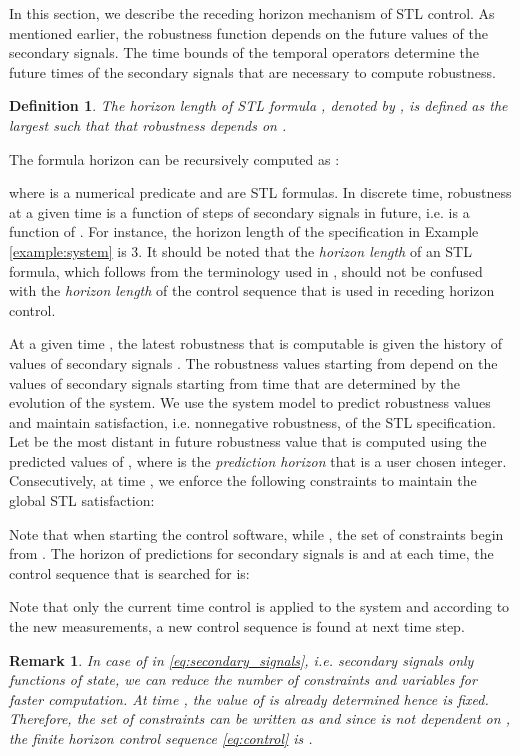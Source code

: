 \documentclass[letterpaper, 10 pt, conference]{ieeeconf}
\newtheorem{define}{Definition}
\newtheorem{remark}{Remark}
\begin{document}
In this section, we describe the receding horizon mechanism of STL control. 
As mentioned earlier, the robustness function depends on the future values of the secondary signals. The time bounds of the temporal operators determine the future times of the secondary signals that are necessary to compute robustness.
\begin{define}
The \emph{horizon} length of STL formula , denoted by , is defined as the largest  such that that robustness  depends on . 
 \end{define}
The formula horizon can be recursively computed as \cite{dokhanchi}:

where  is a numerical predicate and  are STL formulas. In discrete time, robustness at a given time is a function of  steps of secondary signals in future, i.e.  is a function of . 
For instance, the horizon length of the specification in Example \ref{example:system} is 3. It should be noted that the \emph{horizon length} of an STL formula, which follows from the terminology used in \cite{dokhanchi}, should not be confused with the \emph{horizon length} of the control sequence that is used in receding horizon control. 

At a given time , the latest robustness that is computable is  given the history of values of secondary signals . The robustness values starting from  depend on the values of secondary signals starting from time  that are determined by the evolution of the system. We use the system model to predict robustness values and maintain satisfaction, i.e. nonnegative robustness, of the STL specification. Let  be the most distant in future robustness value that is computed using the  predicted values of , where  is  the \emph{prediction horizon} that is a user chosen integer. Consecutively, at time , we enforce the following constraints to maintain the global STL satisfaction:

Note that when starting the control software, while , the set of constraints begin from .
The horizon of predictions for secondary signals is  and at each time, the control sequence that is searched for is:

Note that only the current time control is applied to the system and according to the new measurements, a new control sequence is found at next time step.  
\begin{remark}
In case of  in \eqref{eq:secondary_signals}, i.e. secondary signals only functions of state, we can reduce the number of constraints and variables for faster computation. At time , the value of  is already determined hence  is fixed. Therefore, the set of constraints can be written as  and since  is not dependent on , the finite horizon control sequence \eqref{eq:control} is . \end{remark}
\end{document}
